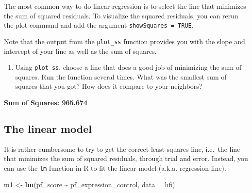 \documentclass[
]{article}
\newenvironment{Shaded}{\begin{snugshade}}{\end{snugshade}}
\newcommand{\AttributeTok}[1]{\textcolor[rgb]{0.13,0.29,0.53}{#1}}
\newcommand{\ConstantTok}[1]{\textcolor[rgb]{0.56,0.35,0.01}{#1}}
\newcommand{\FunctionTok}[1]{\textcolor[rgb]{0.13,0.29,0.53}{\textbf{#1}}}
\newcommand{\NormalTok}[1]{#1}
\newcommand{\OtherTok}[1]{\textcolor[rgb]{0.56,0.35,0.01}{#1}}
\newcommand{\SpecialCharTok}[1]{\textcolor[rgb]{0.81,0.36,0.00}{\textbf{#1}}}
\providecommand{\tightlist}{%
  \setlength{\itemsep}{0pt}\setlength{\parskip}{0pt}}
\begin{document}
The most common way to do linear regression is to select the line that
minimizes the sum of squared residuals. To visualize the squared
residuals, you can rerun the plot command and add the argument
\texttt{showSquares\ =\ TRUE}.

\begin{Shaded}
\end{Shaded}

Note that the output from the \texttt{plot\_ss} function provides you
with the slope and intercept of your line as well as the sum of squares.

\begin{enumerate}
\def\labelenumi{\arabic{enumi}.}
\setcounter{enumi}{3}
\tightlist
\item
  Using \texttt{plot\_ss}, choose a line that does a good job of
  minimizing the sum of squares. Run the function several times. What
  was the smallest sum of squares that you got? How does it compare to
  your neighbors?
\end{enumerate}

\textbf{Sum of Squares: 965.674}

\subsection{The linear model}\label{the-linear-model}

It is rather cumbersome to try to get the correct least squares line,
i.e.~the line that minimizes the sum of squared residuals, through trial
and error. Instead, you can use the \texttt{lm} function in R to fit the
linear model (a.k.a. regression line).

\begin{Shaded}
\begin{Highlighting}[]
\NormalTok{m1 }\OtherTok{\textless{}{-}} \FunctionTok{lm}\NormalTok{(pf\_score }\SpecialCharTok{\textasciitilde{}}\NormalTok{ pf\_expression\_control, }\AttributeTok{data =}\NormalTok{ hfi)}
\end{Highlighting}
\end{Shaded}
\end{document}

